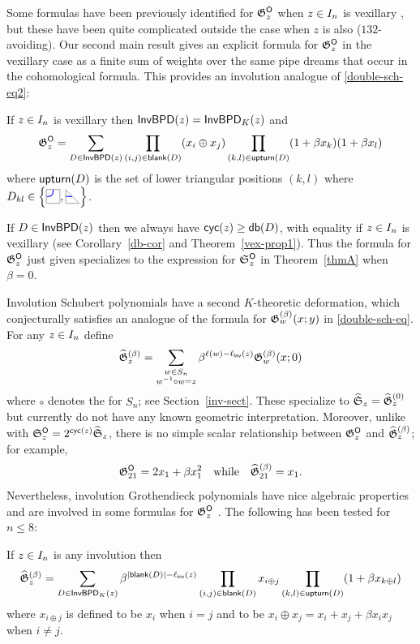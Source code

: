 \documentclass[10pt]{article}
\begin{document}
Some formulas have been previously identified for $\mathfrak{G}^{\mathsf{O}}_z$ when $z \in I_n$ is vexillary \cite{MarPawK,MarWen,WyserYong2017}, but these have been quite complicated outside the case when $z$ is also  ($132$-avoiding).
Our second main result gives an explicit formula for  $\mathfrak{G}^{\mathsf{O}}_z$
in the vexillary case as a finite sum of   weights over the same   pipe dreams that occur in the cohomological formula. %
This provides an involution analogue of \eqref{double-sch-eq2}:


\begin{mainthm}
\label{thmB}
If $z \in I_n$ is vexillary then
$ \mathsf{InvBPD}(z) = \mathsf{InvBPD}_K(z)$ and  \[
\mathfrak{G}^{\mathsf{O}}_z = \sum_{D \in \mathsf{InvBPD}(z)}  \prod_{(i,j)\in \mathsf{blank}(D)} (x_i\oplus x_j) \prod_{(k,l)\in\mathsf{upturn}(D)} (1+\beta x_k)(1+\beta x_l)
\]
where $\mathsf{upturn}(D)$ is the set of  lower triangular positions $(k,l)$
 where $D_{kl}\in \left\{\JTILE,\JDIAG\right\}$.
\end{mainthm}

If $D \in \mathsf{InvBPD}(z)$ then
we always have $\textsf{cyc}(z) \geq \mathsf{db}(D)$, with equality if $z \in I_n$ is vexillary (see  
Corollary~\ref{db-cor}
and Theorem~\ref{vex-prop1}). Thus the formula  for $\mathfrak{G}^{\mathsf{O}}_z$ just given
specializes  to the expression for $ \mathfrak S^{\mathsf{O}}_z$ in Theorem~\ref{thmA} when $\beta=0$.

Involution Schubert polynomials have a second $K$-theoretic deformation,
which conjecturally
satisfies an analogue of the 
formula for $\mathfrak{G}^{(\beta)}_w(x;y)$ in  \eqref{double-sch-eq}.
For any $z \in I_n$ define 
\[ \widehat{\mathfrak{G}}^{(\beta)}_z = \sum_{\substack{w \in S_n \\ w^{-1} \circ w = z}} \beta^{\ell(w) -\ell_{\mathsf{inv}}(z)} \mathfrak{G}^{(\beta)}_w(x;0)\] where $\circ$ denotes the  for $S_n$; see Section~\ref{inv-sect}.
These  specialize to $\widehat{\mathfrak S}_z = \widehat{\mathfrak{G}}^{(0)}_z$ but
 currently do not have any known geometric interpretation. 
 Moreover, unlike with $\mathfrak S^{\mathsf{O}}_z= 2^{\textsf{cyc}(z)}\widehat{\mathfrak S}_z$, there is no simple scalar 
 relationship between $\mathfrak{G}^{\mathsf{O}}_z$ and $\widehat{\mathfrak{G}}^{(\beta)}_z$; for example,
 \[
 \mathfrak{G}^{\mathsf{O}}_{21} = 2x_1 + \beta x_1^2 \quad\text{while}\quad
 \widehat{\mathfrak{G}}^{(\beta)}_{21} = x_1.\]
 Nevertheless, involution Grothendieck polynomials have nice algebraic properties and are involved in some formulas for $\mathfrak{G}^{\mathsf{O}}_z$ \cite{MarbergPawlowski,MarWen}.
The following has been tested for $n\leq 8$:

\begin{conjecture*}
If $z \in I_n$ is any involution then \[
  \widehat{\mathfrak{G}}^{(\beta)}_z = \sum_{D \in \mathsf{InvBPD}_K(z)} \beta^{|\mathsf{blank}(D)| -\ell_{\mathsf{inv}}(z)}\prod_{(i,j) \in \mathsf{blank}(D)} 
  x_{i\oplus j}
 \prod_{(k,l) \in \mathsf{upturn}(D)} 
 (1+\beta x_{k\oplus l})
\]
where $x_{i\oplus j}$ is defined to be $x_i $ when $i=j$
and to be $x_i \oplus x_j = x_i + x_j + \beta x_ix_j$ when $i\neq j$.
\end{conjecture*}
\end{document}
